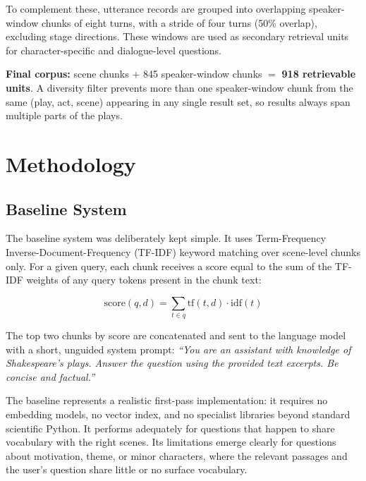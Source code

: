 \documentclass[10pt,conference]{IEEEtran}
\begin{document}
To complement these, utterance records are grouped into overlapping
speaker-window chunks of eight turns, with a stride of four turns
(50\% overlap), excluding stage directions. These windows are used
as secondary retrieval units for character-specific and
dialogue-level questions.

\vspace{6pt}
\begin{mdframed}[style=callout]
\small\noindent\textbf{Final corpus:} scene chunks
$+$ 845 speaker-window chunks $=$ \textbf{918 retrievable units}.
A diversity filter prevents more than one speaker-window chunk from
the same (play, act, scene) appearing in any single result set,
so results always span multiple parts of the plays.
\end{mdframed}

\section{Methodology}
\label{sec:methodology}

\subsection{Baseline System}

The baseline system was deliberately kept simple. It uses
Term-Frequency Inverse-Document-Frequency (TF-IDF) keyword matching
over scene-level chunks only. For a given query, each chunk receives
a score equal to the sum of the TF-IDF weights of any query tokens
present in the chunk text:

\[
  \text{score}(q, d) = \sum_{t \in q} \mathrm{tf}(t,d)\cdot\mathrm{idf}(t)
\]

The top two chunks by score are concatenated and sent to the language
model with a short, unguided system prompt: \textit{``You are an
assistant with knowledge of Shakespeare's plays. Answer the question
using the provided text excerpts. Be concise and factual.''}

The baseline represents a realistic first-pass implementation: it
requires no embedding models, no vector index, and no specialist
libraries beyond standard scientific Python. It performs adequately
for questions that happen to share vocabulary with the right scenes.
Its limitations emerge clearly for questions about motivation, theme,
or minor characters, where the relevant passages and the user's
question share little or no surface vocabulary.
\end{document}
